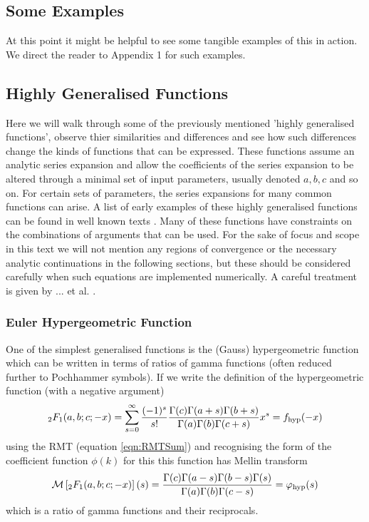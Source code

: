 \documentclass[journal=jcisd8,manuscript=article,layout=onecolumn,pdftex,floatfix,amsmath,amssymb,10pt]{achemso}
\begin{document}
\subsection{Some Examples}
At this point it might be helpful to see some tangible examples of this in action. We direct the reader to {\color{red} Appendix 1} for such examples.


\subsection{Highly Generalised Functions}
Here we will walk through some of the previously mentioned 'highly generalised functions', observe thier similarities and differences and see how such differences change the kinds of functions that can be expressed. These functions assume an analytic series expansion and allow the coefficients of the series expansion to be altered through a minimal set of input parameters, usually denoted $a,b,c$ and so on. For certain sets of parameters, the series expansions for many common functions can arise. A list of early examples of these highly generalised functions can be found in well known texts \cite{Erdelyi,Gradstein}. Many of these functions have constraints on the combinations of arguments that can be used. For the sake of focus and scope in this text we will not mention any regions of convergence or the necessary analytic continuations in the following sections, but these should be considered carefully when such equations are implemented numerically. A careful treatment is given by ... et al. \cite{}.

\subsubsection{{\color{red} Euler} Hypergeometric Function}
One of the simplest generalised functions is the (Gauss) hypergeometric function which can be written in terms of ratios of gamma functions (often reduced further to Pochhammer symbols). If we write the definition of the hypergeometric function (with a negative argument)
\begin{equation}
_2F_1(a,b;c;-x) = \sum_{s=0}^\infty \frac{(-1)^s}{s!} \frac{\Gamma(c)\Gamma(a+s)\Gamma(b+s)}{\Gamma(a)\Gamma(b)\Gamma(c+s)} x^s = f_{\rm hyp}(-x)
\label{eqn:hypergeom}
\end{equation}
using the RMT (equation \ref{eqn:RMTSum}) and recognising the form of the coefficient function $\phi(k)$ for this this function has Mellin transform
\begin{equation}
\mathcal{M}\left[_2F_1(a,b;c;-x)\right](s) = \frac{\Gamma(c)\Gamma(a-s)\Gamma(b-s)\Gamma(s)}{\Gamma(a)\Gamma(b)\Gamma(c-s)} = \varphi_{\rm hyp}(s)
\end{equation}
which is a ratio of gamma functions and their reciprocals.
\end{document}
